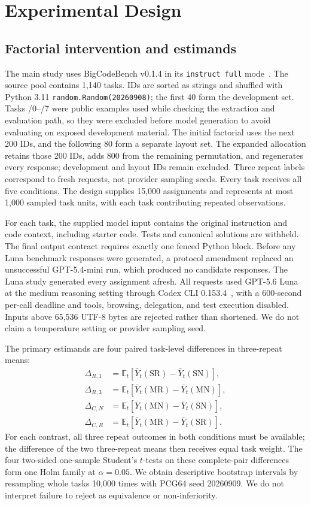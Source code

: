 \section{Experimental Design}
\aieditnote
\subsection{Factorial intervention and estimands}
The main study uses BigCodeBench v0.1.4 in its \texttt{instruct full} mode~\cite{zhuo2024bigcodebench}. The source pool contains 1,140 tasks. IDs are sorted as strings and shuffled with Python 3.11 \texttt{random.Random(20260908)}; the first 40 form the development set. Tasks /0--/7 were public examples used while checking the extraction and evaluation path, so they were excluded before model generation to avoid evaluating on exposed development material. The initial factorial uses the next 200 IDs, and the following 80 form a separate layout set. The expanded allocation retains those 200 IDs, adds 800 from the remaining permutation, and regenerates every response; development and layout IDs remain excluded. Three repeat labels correspond to fresh requests, not provider sampling seeds. Every task receives all five conditions. The design supplies 15,000 assignments and represents at most 1,000 sampled task units, with each task contributing repeated observations.

For each task, the supplied model input contains the original instruction and code context, including starter code. Tests and canonical solutions are withheld. The final output contract requires exactly one fenced Python block. Before any Luna benchmark responses were generated, a protocol amendment replaced an unsuccessful GPT-5.4-mini run, which produced no candidate responses. The Luna study generated every assignment afresh. All requests used GPT-5.6 Luna at the medium reasoning setting through Codex CLI 0.153.4~\cite{openai56luna2026,codexexec2026}, with a 600-second per-call deadline and tools, browsing, delegation, and test execution disabled. Inputs above 65,536 UTF-8 bytes are rejected rather than shortened. We do not claim a temperature setting or provider sampling seed.

The primary estimands are four paired task-level differences in three-repeat means:
\begin{align}
\Delta_{R,1}&=\mathbb{E}_t[\bar Y_t(\mathrm{SR})-\bar Y_t(\mathrm{SN})],\\
\Delta_{R,3}&=\mathbb{E}_t[\bar Y_t(\mathrm{MR})-\bar Y_t(\mathrm{MN})],\\
\Delta_{C,N}&=\mathbb{E}_t[\bar Y_t(\mathrm{MN})-\bar Y_t(\mathrm{SN})],\\
\Delta_{C,R}&=\mathbb{E}_t[\bar Y_t(\mathrm{MR})-\bar Y_t(\mathrm{SR})].
\end{align}
For each contrast, all three repeat outcomes in both conditions must be available; the difference of the two three-repeat means then receives equal task weight. The four two-sided one-sample Student's $t$-tests on these complete-pair differences form one Holm family at $\alpha=0.05$. We obtain descriptive bootstrap intervals by resampling whole tasks 10,000 times with PCG64 seed 20260909. We do not interpret failure to reject as equivalence or non-inferiority.

